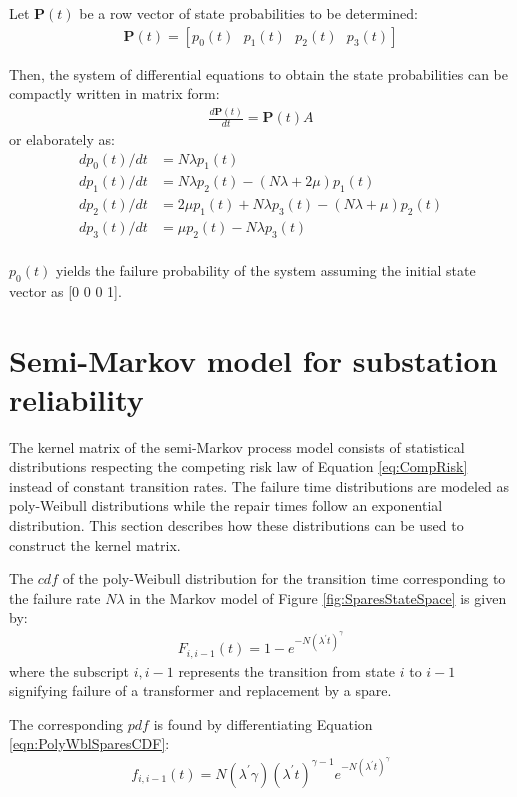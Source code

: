 \documentclass[letterpaper, 12pt]{article}
\begin{document}
Let $\mathbf{P}(t)$ be a row vector of state probabilities to be determined:
\begin{align}
\mathbf{P}(t) = [p_0(t) \text{ } p_1(t) \text{ } p_2(t) \text{ } p_3(t)]
\end{align}

Then, the system of differential equations to obtain the state probabilities can be compactly written in matrix form:
\begin{align}
\frac{d\mathbf{P}(t)}{dt} = \mathbf{P}(t) A
\end{align}
or elaborately as:
\begin{align}
dp_0(t)/dt &=N\lambda p_1(t)	\nonumber \\
dp_1(t)/dt &=N\lambda p_2(t) -( N\lambda + 2\mu)p_1(t)	\nonumber \\
dp_2(t)/dt &=2 \mu p_1(t) +N\lambda p_3(t) -( N\lambda + \mu)p_2(t)	\nonumber \\
dp_3(t)/dt &= \mu p_2(t) -N\lambda p_3(t) \nonumber \\
\end{align}

$p_0(t)$ yields the failure probability of the system assuming the initial state vector as [0 0 0 1].





\section{Semi-Markov model for substation reliability}
\label{sec:SMPSpares}
The kernel matrix of the semi-Markov process model consists of statistical distributions respecting the competing risk law of Equation \ref{eq:CompRisk} instead of constant transition rates. The failure time distributions are modeled as poly-Weibull distributions while the repair times follow an exponential distribution. This section describes how these distributions can be used to construct the kernel matrix.

The $cdf$ of the poly-Weibull distribution for the transition time corresponding to the failure rate $N\lambda$ in the Markov model of Figure \ref{fig:SparesStateSpace} is given by:
\begin{align}
F_{i, i-1}(t) = 1 - e^{-N(\lambda^{'} t)^{\gamma}}
\label{eqn:PolyWblSparesCDF}
\end{align}
where the subscript ${i, i-1}$ represents the transition from state $i$ to $i-1$ signifying failure of a transformer and replacement by a spare.

The corresponding $pdf$ is found by differentiating Equation \ref{eqn:PolyWblSparesCDF}:
\begin{align}
f_{i, i-1}(t) = N(\lambda^{'}\gamma) (\lambda^{'} t)^{\gamma-1}e^{-N(\lambda^{'} t)^{\gamma}}
\label{eqn:PolyWblSparesPDF}
\end{align}
\end{document}
